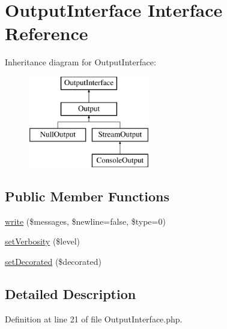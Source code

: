 \hypertarget{interface_symfony_1_1_components_1_1_console_1_1_output_1_1_output_interface}{
\section{OutputInterface Interface Reference}
\label{interface_symfony_1_1_components_1_1_console_1_1_output_1_1_output_interface}
}
Inheritance diagram for OutputInterface:\begin{figure}[H]
\begin{center}
\leavevmode
\includegraphics[height=4.000000cm]{interface_symfony_1_1_components_1_1_console_1_1_output_1_1_output_interface}
\end{center}
\end{figure}
\subsection*{Public Member Functions}
\begin{DoxyCompactItemize}
\item 
\hyperlink{interface_symfony_1_1_components_1_1_console_1_1_output_1_1_output_interface_ae166cb9da545ba8a4d0c74ad02e6e7da}{write} (\$messages, \$newline=false, \$type=0)
\item 
\hyperlink{interface_symfony_1_1_components_1_1_console_1_1_output_1_1_output_interface_a8301c9b79b5f31943343c81ce7a221e8}{setVerbosity} (\$level)
\item 
\hyperlink{interface_symfony_1_1_components_1_1_console_1_1_output_1_1_output_interface_a2c6812e1983f0d47511390f5c2daf1ee}{setDecorated} (\$decorated)
\end{DoxyCompactItemize}


\subsection{Detailed Description}


Definition at line 21 of file OutputInterface.php.



